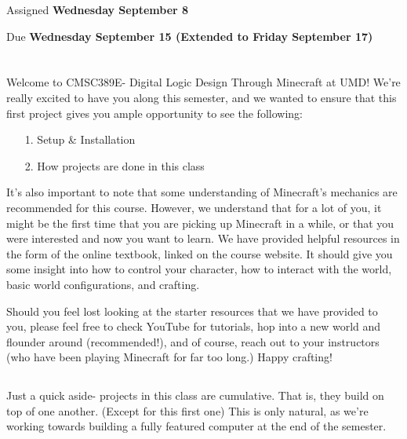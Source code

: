 \documentclass{article}
\begin{document}
\large

{\selectfont{\Huge CMSC389E Project 0: \par Tutorial Island (Or Desert)}}

Assigned \textbf{Wednesday September 8}

Due \textbf{Wednesday September 15 (Extended to Friday September 17)}

\section{\selectfont{Welcome!}}

Welcome to CMSC389E- Digital Logic Design Through Minecraft at UMD! We're really excited to have you along this semester, and we wanted to ensure that this first project gives you ample opportunity to see the following:

\begin{itemize}
  \item[1.] Setup \& Installation
  \item[2. ] How projects are done in this class
\end{itemize}

It's also important to note that some understanding of Minecraft's mechanics are recommended for this course. However, we understand that for a lot of you, it might be the first time that you are picking up Minecraft in a while, or that you were interested and now you want to learn. We have provided helpful resources in the form of the online textbook, linked on the course website. It should give you some insight into how to control your character, how to interact with the world, basic world configurations, and crafting.

Should you feel lost looking at the starter resources that we have provided to you, please feel free to check YouTube for tutorials, hop into a new world and flounder around (recommended!), and of course, reach out to your instructors (who have been playing Minecraft for far too long.) Happy crafting!

\subsection{\selectfont{Projects are Cumulative}}

Just a quick aside- projects in this class are cumulative. That is, they build on top of one another. (Except for this first one) This is only natural, as we're working towards building a fully featured computer at the end of the semester. 
\end{document}
